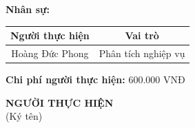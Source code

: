 {\begin{minipage}{\textwidth}
\begin{itemize}
        \end{itemize}
        \noindent \textbf{Nhân sự:}
        \begin{longtable}{|c|c|}
        \hline
        \textbf{Người thực hiện} & \textbf{Vai trò} \\
        \hline
        Hoàng Đức Phong & Phân tích nghiệp vụ \\
        \hline
        \end{longtable}
        \noindent \textbf{Chi phí người thực hiện:} 600.000 VNĐ
        \vspace{1cm}
        \begin{flushleft}
            \hspace{8cm} \textbf{NGƯỜI THỰC HIỆN} \\
            \hspace{9.5cm} (Ký tên) \\
            \vspace{1cm}
        \end{flushleft}
    \end{minipage}
}
